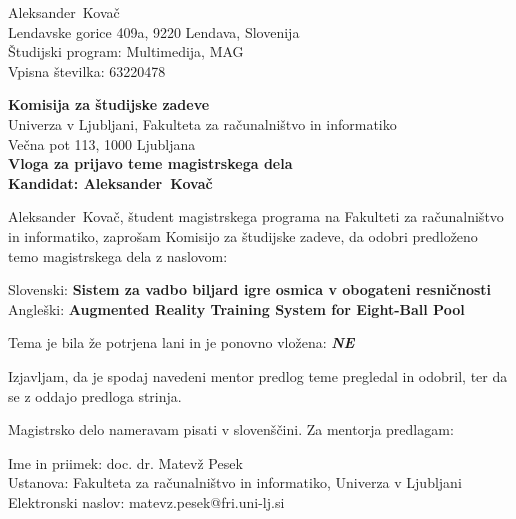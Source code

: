 \documentclass[a4paper, 12pt]{article}
\begin{document}
\newcommand{\ImeKandidata}{Aleksander} %
\newcommand{\PriimekKandidata}{Kovač} %
\newcommand{\VpisnaStevilka}{63220478} %
\newcommand{\StudijskiProgram}{Multimedija, MAG} %
\newcommand{\NaslovBivalisca}{Lendavske gorice 409a, 9220 Lendava, Slovenija} %
\newcommand{\SLONaslov}{Sistem za vadbo biljard igre osmica v obogateni resničnosti} %
\newcommand{\ENGNaslov}{Augmented Reality Training System for Eight-Ball Pool} %

\newcommand{\Kandidat}{\ImeKandidata~\PriimekKandidata}
\noindent
\Kandidat\\
\NaslovBivalisca \\
Študijski program: \StudijskiProgram \\
Vpisna številka: \VpisnaStevilka
\bigskip

{\bf Komisija za študijske zadeve}\\
Univerza v Ljubljani, Fakulteta za računalništvo in informatiko\\
Večna pot 113, 1000 Ljubljana\\

{\Large\bf
{\centering
    Vloga za prijavo teme magistrskega dela \\%
\large Kandidat: \Kandidat \\[10mm]}}


\Kandidat, študent magistrskega programa na Fakulteti za računalništvo in informatiko, zaprošam Komisijo za študijske zadeve, da odobri predloženo temo magistrskega dela z naslovom:

Slovenski: {\bf \SLONaslov}\\
Angleški: {\bf \ENGNaslov}

Tema je bila že potrjena lani in je ponovno vložena: {\bf \textit{NE} }

Izjavljam, da je spodaj navedeni mentor predlog teme pregledal in odobril, ter da se z oddajo predloga strinja.

Magistrsko delo nameravam pisati v slovenščini. 
Za mentorja predlagam:

\hfill\begin{minipage}{\dimexpr\textwidth-2cm}
Ime in priimek: doc. dr. Matevž Pesek\\
Ustanova: Fakulteta za računalništvo in informatiko, Univerza v Ljubljani\\
Elektronski naslov: matevz.pesek@fri.uni-lj.si
\end{minipage}
\end{document}
